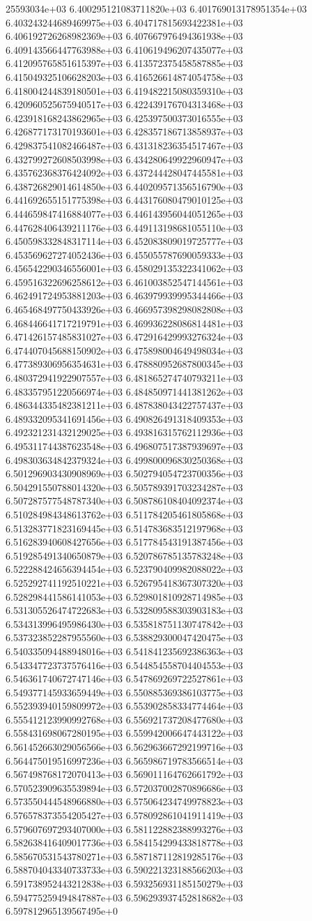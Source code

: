 25593034e+03	6.400295121083711820e+03	6.401769013178951354e+03	6.403243244689469975e+03	6.404717815693422381e+03	6.406192726268982369e+03	6.407667976494361938e+03	6.409143566447763988e+03	6.410619496207435077e+03	6.412095765851615397e+03	6.413572375458587885e+03	6.415049325106628203e+03	6.416526614874054758e+03	6.418004244839180501e+03	6.419482215080359310e+03	6.420960525675940517e+03	6.422439176704313468e+03	6.423918168243862965e+03	6.425397500373016555e+03	6.426877173170193601e+03	6.428357186713858937e+03	6.429837541082466487e+03	6.431318236354517467e+03	6.432799272608503998e+03	6.434280649922960947e+03	6.435762368376424092e+03	6.437244428047445581e+03	6.438726829014614850e+03	6.440209571356516790e+03	6.441692655151775398e+03	6.443176080479010125e+03	6.444659847416884077e+03	6.446143956044051265e+03	6.447628406439211176e+03	6.449113198681055110e+03	6.450598332848317114e+03	6.452083809019725777e+03	6.453569627274052436e+03	6.455055787690059333e+03	6.456542290346556001e+03	6.458029135322341062e+03	6.459516322696258612e+03	6.461003852547144561e+03	6.462491724953881203e+03	6.463979939995344466e+03	6.465468497750433926e+03	6.466957398298082808e+03	6.468446641717219791e+03	6.469936228086814481e+03	6.471426157485831027e+03	6.472916429993276324e+03	6.474407045688150902e+03	6.475898004649498034e+03	6.477389306956354631e+03	6.478880952687800345e+03	6.480372941922907557e+03	6.481865274740793211e+03	6.483357951220566974e+03	6.484850971441381262e+03	6.486344335482381211e+03	6.487838043422757437e+03	6.489332095341691456e+03	6.490826491318409353e+03	6.492321231432129025e+03	6.493816315762112936e+03	6.495311744387623548e+03	6.496807517387939697e+03	6.498303634842379324e+03	6.499800096830250368e+03	6.501296903430908969e+03	6.502794054723700356e+03	6.504291550788014320e+03	6.505789391703234287e+03	6.507287577548787340e+03	6.508786108404092374e+03	6.510284984348613762e+03	6.511784205461805868e+03	6.513283771823169445e+03	6.514783683512197968e+03	6.516283940608427656e+03	6.517784543191387456e+03	6.519285491340650879e+03	6.520786785135783248e+03	6.522288424656394454e+03	6.523790409982088022e+03	6.525292741192510221e+03	6.526795418367307320e+03	6.528298441586141053e+03	6.529801810928714985e+03	6.531305526474722683e+03	6.532809588303903183e+03	6.534313996495986430e+03	6.535818751130747842e+03	6.537323852287955560e+03	6.538829300047420475e+03	6.540335094488948016e+03	6.541841235692386363e+03	6.543347723737576416e+03	6.544854558704404553e+03	6.546361740672747146e+03	6.547869269722527861e+03	6.549377145933659449e+03	6.550885369386103775e+03	6.552393940159809972e+03	6.553902858334774464e+03	6.555412123990992768e+03	6.556921737208477680e+03	6.558431698067280195e+03	6.559942006647443122e+03	6.561452663029056566e+03	6.562963667292199716e+03	6.564475019516997236e+03	6.565986719783566514e+03	6.567498768172070413e+03	6.569011164762661792e+03	6.570523909635539894e+03	6.572037002870896686e+03	6.573550444548966880e+03	6.575064234749978823e+03	6.576578373554205427e+03	6.578092861041911419e+03	6.579607697293407000e+03	6.581122882388993276e+03	6.582638416409017736e+03	6.584154299433818778e+03	6.585670531543780271e+03	6.587187112819285176e+03	6.588704043340733733e+03	6.590221323188566203e+03	6.591738952443212838e+03	6.593256931185150279e+03	6.594775259494847887e+03	6.596293937452818682e+03	6.597812965139567495e+0